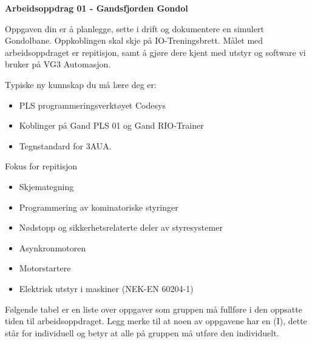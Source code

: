
\noindent
{\bf Arbeidsoppdrag 01 - Gandsfjorden Gondol}

\vskip 5pt

Oppgaven din er å planlegge, sette i drift og dokumentere en simulert Gondolbane. Oppkoblingen skal skje på IO-Treningsbrett. Målet med arbeidsoppdraget er repitisjon, samt å gjøre dere kjent med utstyr og software vi bruker på VG3 Automasjon. 

\vskip 5pt

Typiske ny kunnskap du må lære deg er:
\begin{itemize}[noitemsep]
	\item PLS programmeringsverktøyet Codesys
	\item Koblinger på Gand PLS 01 og Gand RIO-Trainer
	\item Tegnstandard for 3AUA. 
\end{itemize}

Fokus for repitisjon
\begin{itemize}[noitemsep]
	\item Skjemategning
	\item Programmering av kominatoriske styringer
	\item Nødstopp og sikkerhetsrelaterte deler av styresystemer
	\item Asynkronmotoren
	\item Motorstartere
	\item Elektrisk utstyr i maskiner (NEK-EN 60204-1)
\end{itemize}

\vskip 5pt
Følgende tabel er en liste over oppgaver som gruppen må fullføre i den oppsatte tiden til arbeidsoppdraget. Legg merke til at noen av oppgavene har en (I), dette står for individuell og betyr at alle på gruppen må utføre den individuelt.

\vskip 5pt

